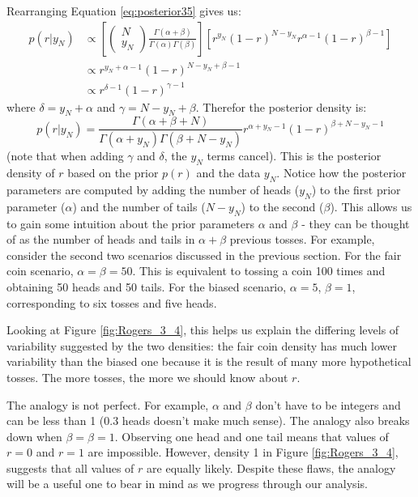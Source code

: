 Rearranging Equation \eqref{eq:posterior35} gives us:
\begin{align*}
p(r|y_N) & \propto \left[
\begin{pmatrix} N \\ y_N \end{pmatrix}
\frac{\Gamma(\alpha + \beta)}{\Gamma(\alpha)\Gamma(\beta)}
\right]
\left[ r^{y_N} (1 - r)^{N - y_N} r^{\alpha - 1} (1 - r)^{\beta - 1} \right] \\
& \propto r^{y_N + \alpha - 1} (1 - r)^{N - y_N + \beta - 1} \\
& \propto r^{\delta - 1} (1 - r)^{\gamma - 1}
\end{align*}
where $\delta = y_N + \alpha$ and $\gamma = N - y_N + \beta$.
Therefor the posterior density is:
\begin{equation}
p(r|y_N) =
\frac{\Gamma(\alpha + \beta + N)}{\Gamma(\alpha + y_N) \Gamma(\beta + N - y_N)}
r^{\alpha + y_N - 1} (1 - r)^{\beta + N - y_N - 1}
\label{eq:coin-posterior}
\end{equation}
(note that when adding $\gamma$ and $\delta$, the $y_N$ terms cancel).
This is the posterior density
of $r$ based on the prior $p(r)$ and the data $y_N$.
Notice how the posterior parameters
are computed by adding the number of heads ($y_N$) to the first prior parameter ($\alpha$)
and the number of tails ($N - y_N$) to the second ($\beta$).
This allows us to gain some
intuition about the prior parameters $\alpha$ and $\beta$ - they can be thought of as the number
of heads and tails in $\alpha + \beta$ previous tosses. For example, consider the second two
scenarios discussed in the previous section. For the fair coin scenario,
$\alpha = \beta = 50$.
This is equivalent to tossing a coin 100 times and obtaining 50 heads and 50 tails.
For the biased scenario, $\alpha = 5$, $\beta = 1$, corresponding to six tosses and five heads.

Looking at Figure \ref{fig:Rogers_3_4}, this helps us explain the differing levels of variability
suggested by the two densities: the fair coin density has much lower variability than
the biased one because it is the result of many more hypothetical tosses. The more
tosses, the more we should know about $r$.

The analogy is not perfect. For example, $\alpha$ and $\beta$ don't have to be integers and
can be less than 1 (0.3 heads doesn't make much sense). The analogy also breaks
down when $\beta = \beta = 1$. Observing one head and one tail means that values of $r = 0$
and $r = 1$ are impossible. However, density 1 in Figure \ref{fig:Rogers_3_4},
suggests that all values
of $r$ are equally likely. Despite these flaws, the analogy will be a useful one to bear
in mind as we progress through our analysis.



